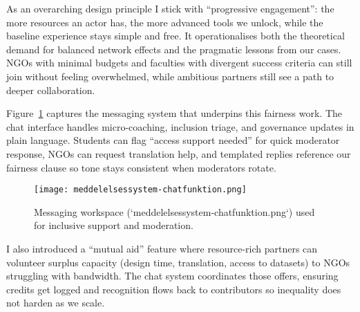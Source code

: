 As an overarching design principle I stick with ``progressive engagement'': the more resources an actor has, the more advanced tools we unlock, while the baseline experience stays simple and free. It operationalises both the theoretical demand for balanced network effects and the pragmatic lessons from our cases. NGOs with minimal budgets and faculties with divergent success criteria can still join without feeling overwhelmed, while ambitious partners still see a path to deeper collaboration.

Figure~\ref{fig:chat-system} captures the messaging system that underpins this fairness work. The chat interface handles micro-coaching, inclusion triage, and governance updates in plain language. Students can flag ``access support needed'' for quick moderator response, NGOs can request translation help, and templated replies reference our fairness clause so tone stays consistent when moderators rotate.

\begin{figure}[h]
  \centering
  \texttt{[image: meddelelsessystem-chatfunktion.png]}
  \caption{Messaging workspace (`meddelelsessystem-chatfunktion.png`) used for inclusive support and moderation.}
  \label{fig:chat-system}
\end{figure}

I also introduced a ``mutual aid'' feature where resource-rich partners can volunteer surplus capacity (design time, translation, access to datasets) to NGOs struggling with bandwidth. The chat system coordinates those offers, ensuring credits get logged and recognition flows back to contributors so inequality does not harden as we scale.
